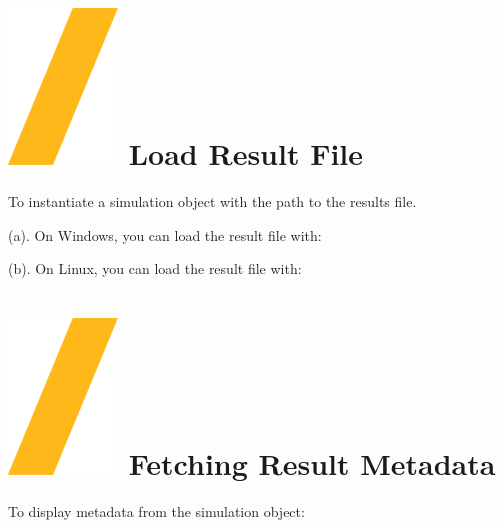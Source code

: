 \documentclass[9pt,landscape]{article}
\begin{document}
\begin{multicols}{3}
\setlength{\premulticols}{1pt}
\setlength{\postmulticols}{1pt}
\setlength{\multicolsep}{1pt}
\setlength{\columnsep}{2pt}

\vfill
\section{\includegraphics[height=\fontcharht\font`\S]{slash.png} Load Result File}

To instantiate a simulation object with the path to the results file. 

\vspace{2mm} %

(a). On Windows, you can load the result file with:


(b). On Linux, you can load the result file with:


\section{\includegraphics[height=\fontcharht\font`\S]{slash.png} Fetching Result Metadata}

To display metadata from the simulation object:



\end{multicols}
\end{document}
